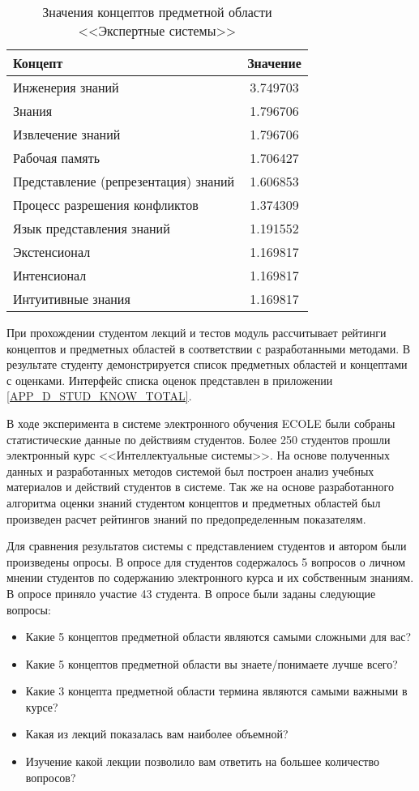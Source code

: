 \begin{table}
\centering
\caption{Значения концептов предметной области <<Экспертные системы>>}
\label{table:term_importance_result}
\begin{tabular}{|p{7cm}|c|}
\hline Концепт & Значение \\
\hline Инженерия знаний & 3.749703 \\
\hline Знания & 1.796706 \\
\hline Извлечение знаний & 1.796706 \\
\hline Рабочая память & 1.706427 \\
\hline Представление (репрезентация) знаний & 1.606853 \\
\hline Процесс разрешения конфликтов & 1.374309 \\
\hline Язык представления знаний & 1.191552 \\
\hline Экстенсионал & 1.169817 \\
\hline Интенсионал & 1.169817 \\
\hline Интуитивные знания & 1.169817 \\
\hline
\end{tabular}
\end{table}

При прохождении студентом  лекций и тестов модуль рассчитывает рейтинги концептов и предметных областей в соответствии с разработанными методами. В результате студенту демонстрируется список предметных областей и концептами с оценками. Интерфейс списка оценок представлен в приложении  \ref{APP_D_STUD_KNOW_TOTAL}.

В ходе эксперимента в системе электронного обучения ECOLE были собраны статистические данные по действиям студентов. Более 250 студентов прошли электронный курс <<Интеллектуальные системы>>. На основе полученных данных и разработанных методов системой был построен анализ учебных материалов и действий студентов в системе. Так же на основе разработанного алгоритма оценки знаний студентом концептов и предметных областей был произведен расчет рейтингов знаний по предопределенным показателям. 

Для сравнения результатов системы с представлением студентов и автором были произведены опросы. В опросе для студентов содержалось 5 вопросов о личном мнении студентов по содержанию электронного курса и их собственным знаниям. В опросе приняло участие 43 студента. В опросе были заданы следующие вопросы:

\begin{itemize}
\item Какие 5 концептов предметной области являются самыми сложными для вас?
\item Какие 5 концептов предметной области вы знаете/понимаете лучше всего?
\item Какие 3 концепта предметной области термина являются самыми важными в курсе?
\item Какая из лекций показалась вам наиболее объемной?
\item Изучение какой лекции позволило вам ответить на большее количество вопросов?
\end{itemize}

